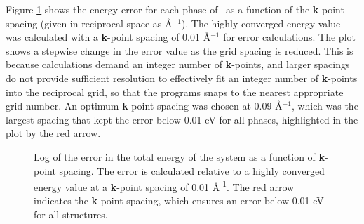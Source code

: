 Figure \ref{Figure:kpoint_convergence} shows the energy error for each phase of \zirconia\ as a function of the \textbf{k}-point spacing (given in reciprocal space as \r{A}$^{-1}$). The highly converged energy value was calculated with a \textbf{k}-point spacing of 0.01 \r{A}$^{-1}$ for error calculations. The plot shows a stepwise change in the error value as the grid spacing is reduced. This is because calculations demand an integer number of \textbf{k}-points, and larger spacings do not provide sufficient resolution to effectively fit an integer number of \textbf{k}-points into the reciprocal grid, so that the programs snaps to the nearest appropriate grid number. An optimum \textbf{k}-point spacing was chosen at 0.09 \r{A}$^{-1}$, which was the largest spacing that kept the error below 0.01 eV for all phases, highlighted in the plot by the red arrow.

\begin{figure}[ht]
\begin{center}
		\caption{Log of the error in the total energy of the system as a function of \textbf{k}-point spacing. The error is calculated relative to a highly converged energy value at a \textbf{k}-point spacing of 0.01 \r{A}\textsuperscript{-1}. The red arrow indicates the \textbf{k}-point spacing, which ensures an error below 0.01 eV for all structures.}
		\label{Figure:kpoint_convergence}
	\end{center}
\end{figure}

